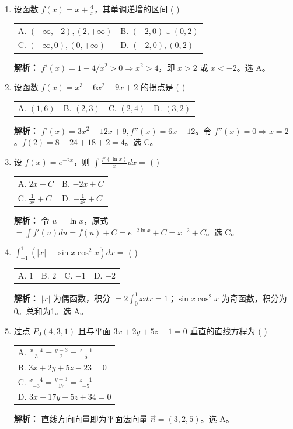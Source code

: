 \documentclass[10pt, a3paper, landscape, twocolumn]{article}
\begin{document}
\begin{enumerate}
    \item 设函数 $f(x) = x + \frac{4}{x}$，其单调递增的区间 ( \quad ) \\
    \begin{tabularx}{\linewidth}{@{} *{2}{X} @{}}
        A. $(-\infty,-2),(2,+\infty)$ & B. $(-2,0) \cup (0,2)$ \\
        C. $(-\infty,0),(0,+\infty)$  & D. $(-2,0),(0,2)$
    \end{tabularx}
    {\color{red} \footnotesize \textbf{解析：} $f'(x) = 1 - 4/x^2 > 0 \Rightarrow x^2 > 4$，即 $x>2$ 或 $x<-2$。选 A。}

    \item 设函数 $f(x) = x^3 - 6x^2 + 9x + 2$ 的拐点是 ( \quad ) \\
    \begin{tabularx}{\linewidth}{@{} *{4}{X} @{}}
        A. $(1,6)$ & B. $(2,3)$ & C. $(2,4)$ & D. $(3,2)$
    \end{tabularx}
    {\color{red} \footnotesize \textbf{解析：} $f'(x)=3x^2-12x+9, f''(x)=6x-12$。令 $f''(x)=0 \Rightarrow x=2$。$f(2)=8-24+18+2=4$。选 C。}

    \item 设 $f(x) = e^{-2x}$，则 $\int \frac{f'(\ln x)}{x} dx =$ ( \quad ) \\
    \begin{tabularx}{\linewidth}{@{} *{2}{X} @{}}
        A. $2x + C$ & B. $-2x + C$ \\
        C. $\frac{1}{x^2} + C$ & D. $-\frac{1}{x^2} + C$
    \end{tabularx}
    {\color{red} \footnotesize \textbf{解析：} 令 $u=\ln x$，原式 $= \int f'(u) du = f(u)+C = e^{-2\ln x}+C = x^{-2}+C$。选 C。}

    \item $\int_{-1}^{1} (|x| + \sin x \cos^2 x) dx =$ ( \quad ) \\
    \begin{tabularx}{\linewidth}{@{} *{4}{X} @{}}
        A. $1$ & B. $2$ & C. $-1$ & D. $-2$
    \end{tabularx}
    {\color{red} \footnotesize \textbf{解析：} $|x|$ 为偶函数，积分 $= 2\int_0^1 x dx = 1$；$\sin x \cos^2 x$ 为奇函数，积分为0。总和为1。选 A。}

    \item 过点 $P_0(4,3,1)$ 且与平面 $3x+2y+5z-1=0$ 垂直的直线方程为 ( \quad ) \\
    \begin{tabularx}{\linewidth}{@{} X @{}}
        A. $\frac{x-4}{3} = \frac{y-3}{2} = \frac{z-1}{5}$ \\
        B. $3x+2y+5z-23=0$ \\
        C. $\frac{x-4}{-3} = \frac{y-3}{17} = \frac{z-1}{-5}$ \\
        D. $3x-17y+5z+34=0$
    \end{tabularx}
    {\color{red} \footnotesize \textbf{解析：} 直线方向向量即为平面法向量 $\vec{n}=(3,2,5)$。选 A。}


\end{enumerate}
\end{document}
